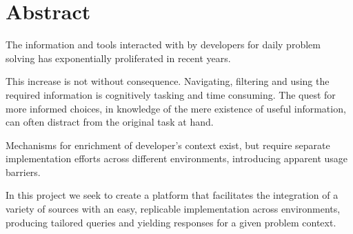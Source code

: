 \chapter*{Abstract}

The information and tools interacted with by developers for daily problem solving has exponentially proliferated in recent years. 

This increase is not without consequence. Navigating, filtering and using the required information is cognitively tasking and time consuming. The quest for more informed choices, in knowledge of the mere existence of useful information, can often distract from the original task at hand. 

Mechanisms for enrichment of developer's context exist, but require separate implementation efforts across different environments, introducing apparent usage barriers.

In this project we seek to create a platform that facilitates the integration of a variety of sources with an easy, replicable implementation across environments, producing tailored queries and yielding responses for a given problem context.  

